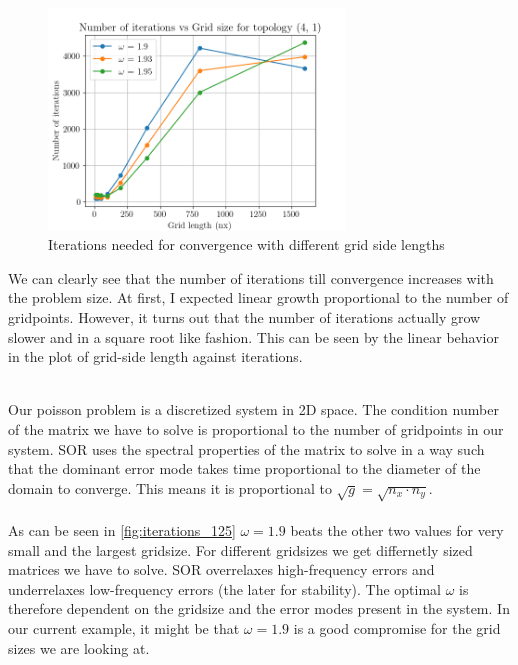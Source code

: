 \begin{figure}[H]
    \centering
    \includegraphics[width=0.7\textwidth]{../fig/lab1/iteration_count_(4, 1)_125.png}
    \caption{Iterations needed for convergence with different grid side lengths}
    \label{fig:iterations_125}
\end{figure}
We can clearly see that the number of iterations till convergence increases with the problem size. At first, I expected linear growth proportional to the number of gridpoints. However, it turns out that the number of iterations actually grow slower and in a square root like fashion. This can be seen by the linear behavior in the plot of grid-side length against iterations. 

\\
Our poisson problem is a discretized system in 2D space. The condition number of the matrix we have to solve is proportional to the number of gridpoints in our system. SOR uses the spectral properties of the matrix to solve in a way such that the dominant error mode takes time proportional to the diameter of the domain to converge. This means it is proportional to $\sqrt{g} = \sqrt{n_x \cdot n_y}$.\\

\\
As can be seen in \autoref{fig:iterations_125} $\omega = 1.9$ beats the other two values for very small and the largest gridsize. For different gridsizes we get differnetly sized matrices we have to solve. SOR overrelaxes high-frequency errors and underrelaxes low-frequency errors (the later for stability). The optimal $\omega$ is therefore dependent on the gridsize and the error modes present in the system. In our current example, it might be that $\omega = 1.9$ is a good compromise for the grid sizes we are looking at.


